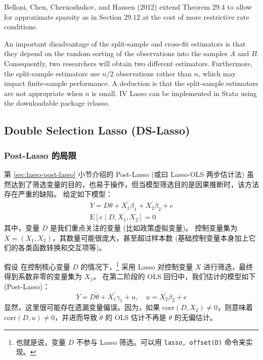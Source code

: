 Belloni, Chen, Chernozhukov, and Hansen (2012) extend Theorem $29.4$ to allow for approximate sparsity as in Section $29.12$ at the cost of more restrictive rate conditions.

An important disadvantage of the split-sample and cross-fit estimators is that they depend on the random sorting of the observations into the samples $A$ and $B$. Consequently, two researchers will obtain two different estimators. Furthermore, the split-sample estimators use $n / 2$ observations rather than $n$, which may impact finite-sample performance. A deduction is that the split-sample estimators are not appropriate when $n$ is small.
IV Lasso can be implemented in Stata using the downloadable package ivlasso.
\fi      %



\subsection{Double Selection Lasso (DS-Lasso)}\label{sec:lasso-DSL}


\subsubsection{Post-Lasso 的局限}
第 \ref{sec:lasso-post-lasso} 小节介绍的 Post-Lasso (或曰 Lasso-OLS 两步估计法) 虽然达到了筛选变量的目的，也易于操作，但当模型筛选目的是因果推断时，该方法存在严重的缺陷。
给定如下模型：
\begin{equation}\label{eq:lasso-DS-01}
\begin{aligned}%
Y =D \theta + X_1^{\prime} \beta_1 + X_2^{\prime} \beta_2 + e \\
\mathrm{E}[e \mid D, X_1, X_2] =0
\end{aligned}
\end{equation}
其中，变量 $D$ 是我们重点关注的变量 (比如政策虚拟变量)。
控制变量集为 $X = (X_1, X_2)$，其数量可能很庞大，甚至超过样本数 (基础控制变量本身加上它们的各类函数转换和交互项等)。

假设%
在控制核心变量 $D$ 的情况下，\footnote{%
   也就是说，变量 $D$ 不参与 Lasso 筛选。可以用 \texttt{lasso, offset(D)} 命令来实现。}
采用 Lasso 对控制变量 $X$ 进行筛选，最终得到系数非零的变量集为 $X_1$。
在第二阶段的 OLS 回归中，我们估计的模型如下 (Post-Lasso)：
\begin{equation}\label{eq:lasso-DS-02}
Y =D \widetilde{\theta} + X_1^{\prime} \gamma_1 + u, \quad u= X_2^{\prime} \beta_2 + e
\end{equation}
显然，这里很可能存在遗漏变量偏误。因为，如果 $\mathrm{corr}(D,X_2) \neq 0$，则意味着 $\mathrm{corr}(D,u)\neq 0$，并进而导致 ${\widetilde{\theta}}$ 的 OLS 估计不再是 $\theta$ 的无偏估计。 

